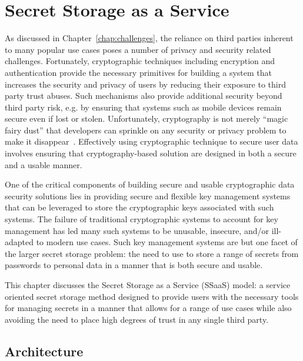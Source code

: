 \chapter{Secret Storage as a Service}
\label{chap:ssaas}

As discussed in Chapter~\ref{chap:challenges}, the reliance on third
parties inherent to many popular use cases poses a number of privacy
and security related challenges. Fortunately, cryptographic techniques
including encryption and authentication provide the necessary
primitives for building a system that increases the security and
privacy of users by reducing their exposure to third party trust
abuses. Such mechanisms also provide additional security beyond third
party risk, e.g. by ensuring that systems such as mobile devices remain
secure even if lost or stolen. Unfortunately, cryptography is not
merely ``magic fairy dust'' that developers can sprinkle on any
security or privacy problem to make it
disappear~\cite{smith2003}. Effectively using cryptographic technique
to secure user data involves ensuring that cryptography-based solution
are designed in both a secure and a usable manner.

One of the critical components of building secure and usable
cryptographic data security solutions lies in providing secure and
flexible key management systems that can be leveraged to store the
cryptographic keys associated with such systems. The failure of
traditional cryptographic systems to account for key management has
led many such systems to be unusable, insecure, and/or ill-adapted to
modern use cases. Such key management systems are but one facet of the
larger secret storage problem: the need to use to store a range of
secrets from passwords to personal data in a manner that is both
secure and usable.

This chapter discusses the Secret Storage as a Service (SSaaS) model:
a service oriented secret storage method designed to provide users
with the necessary tools for managing secrets in a manner that allows
for a range of use cases while also avoiding the need to place high
degrees of trust in any single third party.

\section{Architecture}
\label{chap:ssaas:arch}

